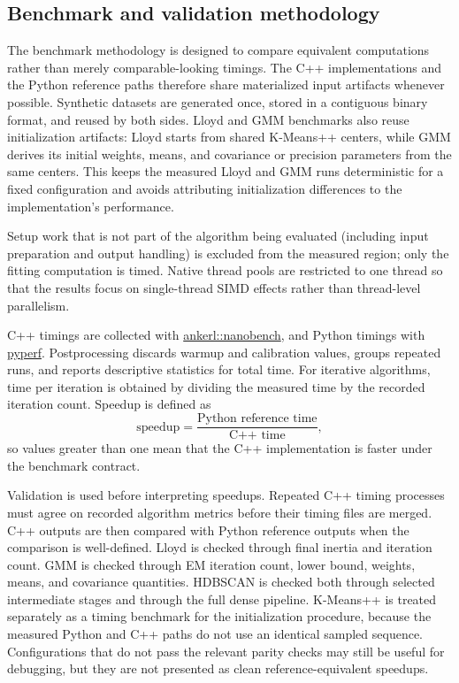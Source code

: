 \documentclass[11pt,a4paper]{article}
\begin{document}
\subsection{Benchmark and validation methodology}

The benchmark methodology is designed to compare equivalent computations rather than merely comparable-looking timings. The C++ implementations and the Python reference paths therefore share materialized input artifacts whenever possible. Synthetic datasets are generated once, stored in a contiguous binary format, and reused by both sides. Lloyd and GMM benchmarks also reuse initialization artifacts: Lloyd starts from shared K-Means++ centers, while GMM derives its initial weights, means, and covariance or precision parameters from the same centers. This keeps the measured Lloyd and GMM runs deterministic for a fixed configuration and avoids attributing initialization differences to the implementation's performance.

Setup work that is not part of the algorithm being evaluated (including input preparation and output handling) is excluded from the measured region; only the fitting computation is timed. Native thread pools are restricted to one thread so that the results focus on single-thread SIMD effects rather than thread-level parallelism.

C++ timings are collected with \href{https://github.com/martinus/nanobench}{ankerl::nanobench}, and Python timings with \href{https://github.com/psf/pyperf}{pyperf}. Postprocessing discards warmup and calibration values, groups repeated runs, and reports descriptive statistics for total time. For iterative algorithms, time per iteration is obtained by dividing the measured time by the recorded iteration count. Speedup is defined as
\[
  \text{speedup} = \frac{\text{Python reference time}}{\text{C++ time}},
\]
so values greater than one mean that the C++ implementation is faster under the benchmark contract.

Validation is used before interpreting speedups. Repeated C++ timing processes must agree on recorded algorithm metrics before their timing files are merged. C++ outputs are then compared with Python reference outputs when the comparison is well-defined. Lloyd is checked through final inertia and iteration count. GMM is checked through EM iteration count, lower bound, weights, means, and covariance quantities. HDBSCAN is checked both through selected intermediate stages and through the full dense pipeline. K-Means++ is treated separately as a timing benchmark for the initialization procedure, because the measured Python and C++ paths do not use an identical sampled sequence. Configurations that do not pass the relevant parity checks may still be useful for debugging, but they are not presented as clean reference-equivalent speedups.
\end{document}
